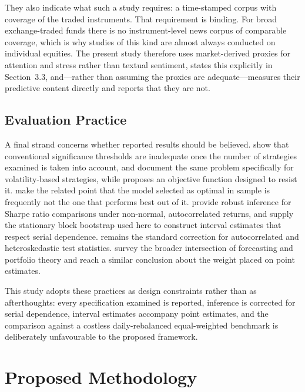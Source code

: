 \documentclass{singlecol-new}
\theoremstyle{TH}{
\newtheorem{lemma}{Lemma}
\newtheorem{theorem}[lemma]{Theorem}
\newtheorem{corrolary}[lemma]{Corrolary}
\newtheorem{conjecture}[lemma]{Conjecture}
\newtheorem{proposition}[lemma]{Proposition}
\newtheorem{claim}[lemma]{Claim}
\newtheorem{stheorem}[lemma]{Wrong Theorem}
\newtheorem{algorithm}{Algorithm}
}
\theoremstyle{THrm}{
\newtheorem{definition}{Definition}[section]
\newtheorem{question}{Question}[section]
\newtheorem{remark}{Remark}
\newtheorem{scheme}{Scheme}
}
\theoremstyle{THhit}{
\newtheorem{case}{Case}[section]
}
\begin{document}
They also indicate what such a study requires: a time-stamped corpus with coverage of
the traded instruments. That requirement is binding. For broad exchange-traded funds
there is no instrument-level news corpus of comparable coverage, which is why studies
of this kind are almost always conducted on individual equities. The present study
therefore uses market-derived proxies for attention and stress rather than textual
sentiment, states this explicitly in Section~3.3, and---rather than assuming the proxies
are adequate---measures their predictive content directly and reports that they are
not.

\subsection{Evaluation Practice}

A final strand concerns whether reported results should be believed.
\citet{harvey15} show that conventional significance thresholds are inadequate once the
number of strategies examined is taken into account, and \citet{valls26} document the
same problem specifically for volatility-based strategies, while \citet{sheppert26}
proposes an objective function designed to resist it. \citet{zhangz25} make the related
point that the model selected as optimal in sample is frequently not the one that
performs best out of it. \citet{ledoit08} provide
robust inference for Sharpe ratio comparisons under non-normal, autocorrelated returns,
and \citet{politis94} supply the stationary block bootstrap used here to construct
interval estimates that respect serial dependence. \citet{newey87} remains the standard
correction for autocorrelated and heteroskedastic test statistics.
\citet{raimundo26} survey the broader intersection of forecasting and portfolio theory
and reach a similar conclusion about the weight placed on point estimates.

This study adopts these practices as design constraints rather than as afterthoughts:
every specification examined is reported, inference is corrected for serial dependence,
interval estimates accompany point estimates, and the comparison against a costless
daily-rebalanced equal-weighted benchmark is deliberately unfavourable to the proposed
framework.

\section{Proposed Methodology}
\label{sec:method}
\end{document}
